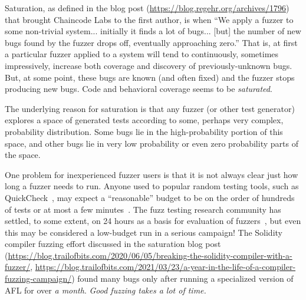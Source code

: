 Saturation, as defined in the blog post (\url{https://blog.regehr.org/archives/1796}) that brought Chaincode Labs to the first author, is when ``We apply a fuzzer to some non-trivial system... initially it finds a lot of bugs... [but] the number of new bugs found by the fuzzer drops off, eventually approaching zero.''  That is, at first a particular fuzzer applied to a system will tend to continuously, sometimes impressively, increase both coverage and discovery of previously-unknown bugs.  But, at some point, these bugs are known (and often fixed) and the fuzzer stops producing new bugs.  Code and behavioral coverage seems to be \emph{saturated}.

The underlying reason for saturation is that any fuzzer (or other test generator) explores a space of generated tests according to some, perhaps very complex, probability distribution.  Some bugs lie in the high-probability portion of this space, and other bugs lie in very low probability or even zero probability parts of the space.  

\begin{sloppypar}
  One problem for inexperienced fuzzer users is that it is not always clear just how long a fuzzer needs to run.  Anyone used to popular random testing tools, such as QuickCheck~\cite{ClaessenH00}, may expect a ``reasonable'' budget to be on the order of hundreds of tests or at most a few minutes~\cite{HolmesLOC}.  The fuzz testing research community has settled, to some extent, on 24 hours as a basis for evaluation of fuzzers~\cite{evalfuzz}, but even this may be considered a low-budget run in a serious campaign!  The Solidity compiler fuzzing effort discussed in the saturation blog post (\url{https://blog.trailofbits.com/2020/06/05/breaking-the-solidity-compiler-with-a-fuzzer/}, \url{https://blog.trailofbits.com/2021/03/23/a-year-in-the-life-of-a-compiler-fuzzing-campaign/}) found many bugs only after running a specialized version of AFL for over \emph{a month}.   \emph{Good fuzzing takes a lot of time.}
  \end{sloppypar}

